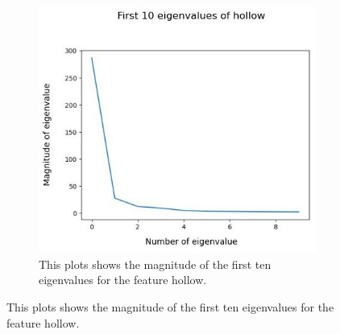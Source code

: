 
\begin{figure}[!h]
	\centering
	\begin{subfigure}{0.7\textwidth}
		\includegraphics[width=0.9\linewidth]{Figures/chapter04/pca_hollow_graph.png} 
		\caption{This plots shows the magnitude of the first ten eigenvalues for the feature hollow.}
	\end{subfigure}
	\vspace{20pt}
	

\end{figure}
